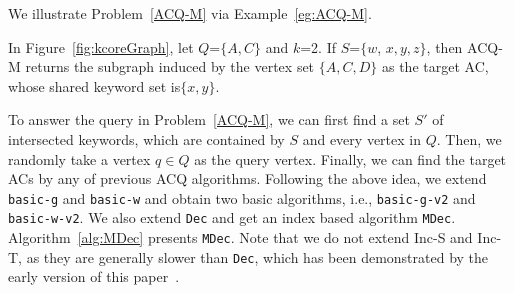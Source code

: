 {We illustrate Problem~\ref{ACQ-M} via Example~\ref{eg:ACQ-M}.

\begin{example}
\label{eg:ACQ-M}
In Figure~\ref{fig:kcoreGraph}, let $Q$=$\{A,C\}$ and $k$=2.
If $S$=$\{w$, $x,y,z\}$, then ACQ-M returns the subgraph induced by the vertex set $\{A,C,D\}$ as the target AC, whose shared keyword set is$\{x,y\}$.
\end{example}

To answer the query in Problem~\ref{ACQ-M}, we can first find a set $S'$ of intersected keywords, which are contained by $S$ and every vertex in $Q$. Then, we randomly take a vertex $q$$\in$$Q$ as the query vertex.
Finally, we can find the target ACs by any of previous ACQ algorithms.
Following the above idea, we extend {\tt basic-g} and {\tt basic-w} and obtain two basic algorithms, i.e., {\tt basic-g-v2} and {\tt basic-w-v2}. We also extend {\tt Dec} and get an index based algorithm {\tt MDec}.
Algorithm~\ref{alg:MDec} presents {\tt MDec}.
Note that we do not extend {Inc-S} and {Inc-T}, as they are generally slower than {\tt Dec}, which has been demonstrated by the early version of this paper~\cite{fangeffective}.


} 